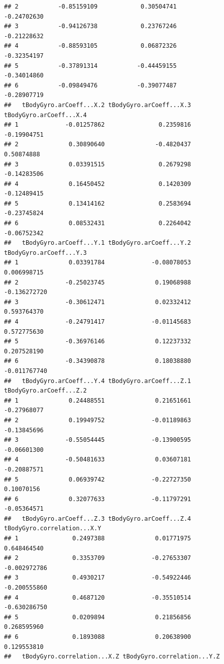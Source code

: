 \documentclass[
]{article}
\begin{document}
\begin{verbatim}
## 2           -0.85159109            0.30504741             -0.24702630
## 3           -0.94126738            0.23767246             -0.21228632
## 4           -0.88593105            0.06872326             -0.32354197
## 5           -0.37891314           -0.44459155             -0.34014860
## 6           -0.09849476           -0.39077487             -0.28907719
##   tBodyGyro.arCoeff...X.2 tBodyGyro.arCoeff...X.3 tBodyGyro.arCoeff...X.4
## 1             -0.01257862               0.2359816             -0.19904751
## 2              0.30890640              -0.4820437              0.50874888
## 3              0.03391515               0.2679298             -0.14283506
## 4              0.16450452               0.1420309             -0.12489415
## 5              0.13414162               0.2583694             -0.23745824
## 6              0.08532431               0.2264042             -0.06752342
##   tBodyGyro.arCoeff...Y.1 tBodyGyro.arCoeff...Y.2 tBodyGyro.arCoeff...Y.3
## 1              0.03391784             -0.08078053             0.006998715
## 2             -0.25023745              0.19068988            -0.136272720
## 3             -0.30612471              0.02332412             0.593764370
## 4             -0.24791417             -0.01145683             0.572775630
## 5             -0.36976146              0.12237332             0.207528190
## 6             -0.34390878              0.18038880            -0.011767740
##   tBodyGyro.arCoeff...Y.4 tBodyGyro.arCoeff...Z.1 tBodyGyro.arCoeff...Z.2
## 1              0.24488551              0.21651661             -0.27968077
## 2              0.19949752             -0.01189863             -0.13845696
## 3             -0.55054445             -0.13900595             -0.06601300
## 4             -0.50481633              0.03607181             -0.20887571
## 5              0.06939742             -0.22727350              0.10070156
## 6              0.32077633             -0.11797291             -0.05364571
##   tBodyGyro.arCoeff...Z.3 tBodyGyro.arCoeff...Z.4 tBodyGyro.correlation...X.Y
## 1               0.2497388              0.01771975                 0.648464540
## 2               0.3353709             -0.27653307                -0.002972786
## 3               0.4930217             -0.54922446                -0.200555860
## 4               0.4687120             -0.35510514                -0.630286750
## 5               0.0209894              0.21856856                 0.268595960
## 6               0.1893088              0.20638900                 0.129553810
##   tBodyGyro.correlation...X.Z tBodyGyro.correlation...Y.Z

\end{verbatim}
\end{document}
